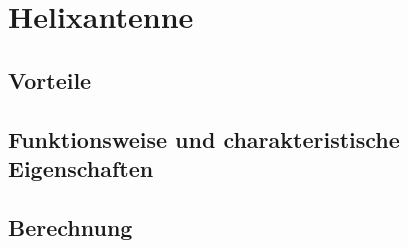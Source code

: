 \section{Helixantenne}

\subsection{Vorteile}

\subsection{Funktionsweise und charakteristische Eigenschaften}

\subsection{Berechnung}